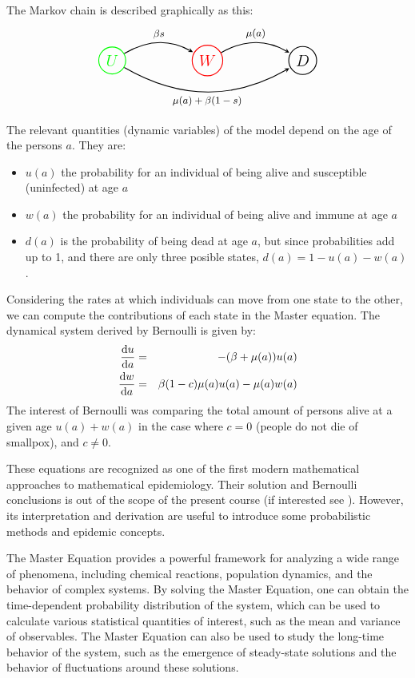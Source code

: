 The Markov chain is described graphically as this:
\[
\begin{tikzpicture}[->,>=stealth,shorten >=1pt,auto,node distance=3cm, thick,main node/.style={circle,draw,font=\sffamily\Large\bfseries}]

  \node[main node, green] (U) {$U$};
  \node[main node, red] (W) [right of=U] {$W$};
  \node[main node] (D) [right of=W] {$D$};

  \path[every node/.style={font=\sffamily\small}]
    (U) edge [bend left] node [above] {$\beta s $} (W)
    (U) edge [bend right] node [below] {$\mu(a) + \beta (1-s) $} (D)
    (W) edge [bend left] node [above] {$\mu(a)$} (D);
\end{tikzpicture}
\]

The relevant quantities (dynamic variables) of the model depend on the age of the persons $a$. They are:
\begin{itemize}
 \item $u(a)$ the probability for an individual of being alive and susceptible (uninfected) at age $a$
 \item $w(a)$ the probability for an individual of being alive and immune at age $a$
 \item $d(a)$ is the probability of being dead at age $a$, but since probabilities add up to 1, and there are only three posible states, $d(a) = 1-u(a) -w(a)$.
 \end{itemize}

Considering the rates at which individuals can move from one state to the other, we can compute the contributions of each state in the Master equation. 
The dynamical system derived by Bernoulli is given by:
\begin{eqnarray*}
 \frac{\mathrm{d} u}{\mathrm{d} a} &=& -(\beta + \mu(a)) u(a) \\
 \frac{\mathrm{d} w}{\mathrm{d} a} &=& \beta (1-c) \mu(a) u(a) -\mu(a) w(a)
\end{eqnarray*}
The interest of Bernoulli was comparing the total amount of persons alive at a given age $u(a)+w(a)$ in the case where $c=0$ (people do not die of smallpox), and $c\neq 0$.

These equations  are recognized as one of the first modern mathematical approaches to mathematical epidemiology. Their solution and Bernoulli conclusions is out of the scope of the present course (if interested see \cite{dietz02}). However, its interpretation and derivation are useful to introduce some probabilistic methods and epidemic concepts. 

The Master Equation provides a powerful framework for analyzing a wide range of phenomena, including chemical reactions, population dynamics, and the behavior of complex systems. By solving the Master Equation, one can obtain the time-dependent probability distribution of the system, which can be used to calculate various statistical quantities of interest, such as the mean and variance of observables. The Master Equation can also be used to study the long-time behavior of the system, such as the emergence of steady-state solutions and the behavior of fluctuations around these solutions.

